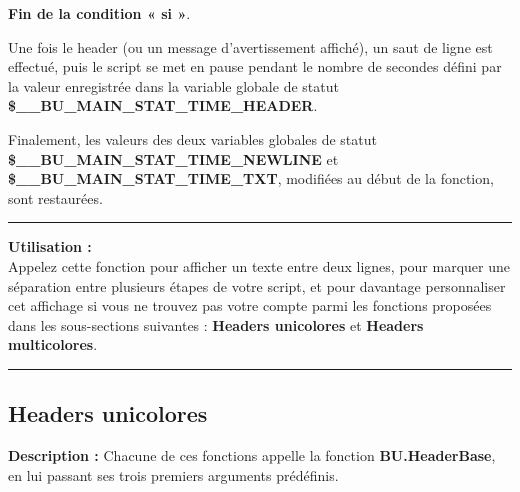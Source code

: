 \documentclass[a4paper,10pt]{article}
\begin{document}
\begin{justify}
    \textbf{\color{cond}Fin de la condition « si »}.
\end{justify}

\setlength{\parskip}{2em}


\begin{justify}
    Une fois le header (ou un message d'avertissement affiché), un saut de ligne est effectué, puis le script se met en pause pendant le nombre de secondes défini par la valeur enregistrée dans la variable globale de statut \textbf{\color{vars}\$\_\_BU\_MAIN\_STAT\_TIME\_HEADER}.
\end{justify}

\setlength{\parskip}{2em}

\begin{justify}
    Finalement, les valeurs des deux variables globales de statut \textbf{\color{vars}\$\_\_BU\_MAIN\_STAT\_TIME\_NEWLINE} et \textbf{\color{vars}\$\_\_BU\_MAIN\_STAT\_TIME\_TXT}, modifiées au début de la fonction, sont restaurées.
\end{justify}

\setlength{\parskip}{1em}

\par\noindent\rule{\textwidth}{0.4pt}

\begin{justify}
    \textbf{Utilisation :}\\[1\baselineskip]
    Appelez cette fonction pour afficher un texte entre deux lignes, pour marquer une séparation entre plusieurs étapes de votre script, et pour davantage personnaliser cet affichage si vous ne trouvez pas votre compte parmi les fonctions proposées dans les sous-sections suivantes : \textbf{\color{sec2}Headers unicolores} et \textbf{\color{sec2}Headers multicolores}.
\end{justify}




\color{sec2}\par\noindent\rule{\textwidth}{0.4pt}\color{text}

\color{sec2}
\subsection{Headers unicolores}\color{text}

\begin{justify}
    \textbf{Description :}
    Chacune de ces fonctions appelle la fonction \textbf{\color{func}BU.HeaderBase}, en lui passant ses trois premiers arguments prédéfinis.
\end{justify}
\end{document}
